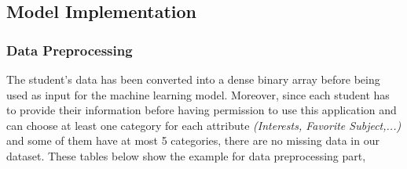 \documentclass[12pt]{article}
\begin{document}
\subsection{Model Implementation}
\subsubsection{Data Preprocessing}
The student's data has been converted into a dense binary array before being used as input for the machine learning model. Moreover, since each student has to provide their information before having permission to use this application and can choose at least one category for each attribute \emph{(Interests, Favorite Subject,...)} and some of them have at most 5 categories, there are no missing data in our dataset. These tables below show the example for data preprocessing part,

\begin{table}[H]
\caption{Data before preprocessing}
\label{data preprocessing}
\end{table}

\begin{table}[H]
\centering
{}
\caption{Data after preprocessing}
\label{data preprocessing}
\end{table}
\end{document}
